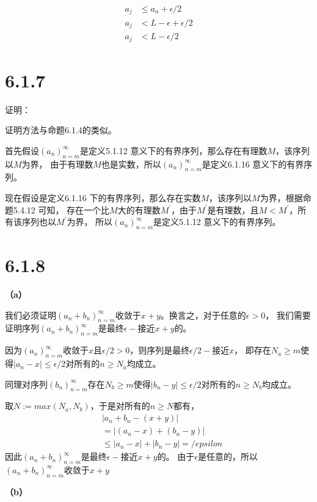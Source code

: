 \documentclass{article}
\theoremstyle{mystyle}
\begin{document}
\begin{align*}
  a_j & \leq a_n + \epsilon/2       \\
  a_j & < L - \epsilon + \epsilon/2 \\
  a_j & < L - \epsilon/2
\end{align*}

\section*{6.1.7}

证明：

证明方法与命题6.1.4的类似。

首先假设$(a_n)_{n=m}^\infty$是定义5.1.12 意义下的有界序列，那么存在有理数$M$，该序列以$M$为界，
由于有理数$M$也是实数，所以$(a_n)_{n=m}^\infty$是定义6.1.16 意义下的有界序列。

现在假设是定义6.1.16 下的有界序列，那么存在实数$M$，该序列以$M$为界，根据命题5.4.12 可知，
存在一个比$M$大的有理数$M^\prime$，由于$M^\prime$是有理数，且$M < M^\prime$，所有该序列也以$M^\prime$为界，
所以$(a_n)_{n=m}^\infty$是定义5.1.12 意义下的有界序列。

\section*{6.1.8}

\textbf{（a）}

我们必须证明$(a_n+b_n)_{n=m}^\infty$收敛于$x+y$。换言之，对于任意的$\epsilon > 0$，
我们需要证明序列$(a_n+b_n)_{n=m}^\infty$是最终$\epsilon -$接近$x+y$的。

因为$(a_n)_{n=m}^\infty$收敛于$x$且$\epsilon /2 > 0$，则序列是最终$\epsilon /2 -$接近$x$，
即存在$N_a \geq m$使得$|a_n - x| \leq \epsilon /2$对所有的$n \geq N_a$均成立。

同理对序列$(b_n)_{n=m}^\infty$存在$N_b \geq m$使得$|b_n - y| \leq \epsilon /2$对所有的$n \geq N_b$均成立。

取$N := max(N_a, N_b)$，于是对所有的$n \geq N$都有，
\begin{align*}
   & |a_n + b_n - (x+y)|                   \\
   & =|(a_n - x) + (b_n - y)|              \\
   & \leq |a_n - x| + |b_n - y| = /epsilon
\end{align*}
因此$(a_n+b_n)_{n=m}^\infty$是最终$\epsilon -$接近$x+y$的。
由于$\epsilon$是任意的，所以$(a_n+b_n)_{n=m}^\infty$收敛于$x+y$

\textbf{（b）}
\end{document}
